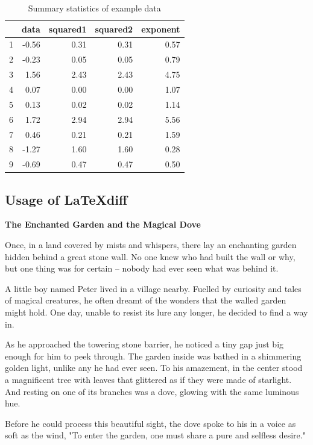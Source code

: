 \documentclass[10pt, fullpage, a4paper, titlepage]{article}
\begin{document}
\begin{table}[ht]
\centering
\caption{Summary statistics of example data}
\label{tab:example}
\begin{tabular}{rrrrr}
  \hline
 & data & squared1 & squared2 & exponent \\ 
  \hline
1 & -0.56 & 0.31 & 0.31 & 0.57 \\ 
2 & -0.23 & 0.05 & 0.05 & 0.79 \\ 
3 & 1.56 & 2.43 & 2.43 & 4.75 \\ 
4 & 0.07 & 0.00 & 0.00 & 1.07 \\ 
5 & 0.13 & 0.02 & 0.02 & 1.14 \\ 
6 & 1.72 & 2.94 & 2.94 & 5.56 \\ 
7 & 0.46 & 0.21 & 0.21 & 1.59 \\ 
8 & -1.27 & 1.60 & 1.60 & 0.28 \\ 
9 & -0.69 & 0.47 & 0.47 & 0.50 \\ 
   \hline
\end{tabular}
\end{table}

\subsection{Usage of LaTeXdiff}

\textbf{The Enchanted Garden and the Magical Dove}

Once, in a land covered by mists and whispers, there lay an enchanting garden hidden behind a great stone wall. No one knew who had built the wall or why, but one thing was for certain – nobody had ever seen what was behind it.

A little boy named Peter lived in a village nearby. Fuelled by curiosity and tales of magical creatures, he often dreamt of the wonders that the walled garden might hold. One day, unable to resist its lure any longer, he decided to find a way in.

As he approached the towering stone barrier, he noticed a tiny gap just big enough for him to peek through. The garden inside was bathed in a shimmering golden light, unlike any he had ever seen. To his amazement, in the center stood a magnificent tree with leaves that glittered as if they were made of starlight. And resting on one of its branches was a dove, glowing with the same luminous hue.

Before he could process this beautiful sight, the dove spoke to his in a voice as soft as the wind, "To enter the garden, one must share a pure and selfless desire."
\end{document}
